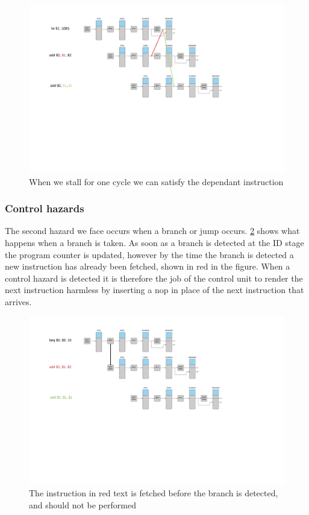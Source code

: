 \begin{figure}[h!]
    \includegraphics[width=\linewidth]{img/lw_hazard_handled.png}
    \caption{When we stall for one cycle we can satisfy the dependant instruction}
    \label{fig:hazard2}
\end{figure}

\subsubsection{Control hazards}
The second hazard we face occurs when a branch or jump occurs. \ref{fig:ctrl1} shows what happens when a branch is taken.
As soon as a branch is detected at the ID stage the program counter is updated, however by the time the branch is detected a new instruction has already been fetched, shown in red in the figure.
When a control hazard is detected it is therefore the job of the control unit to render the next instruction harmless by inserting a nop in place of the next instruction that arrives.

\begin{figure}[h!]
    \includegraphics[width=\linewidth]{img/ctrl_haz.png}
    \caption{The instruction in red text is fetched before the branch is detected, and should not be performed}
    \label{fig:ctrl1}
\end{figure}
